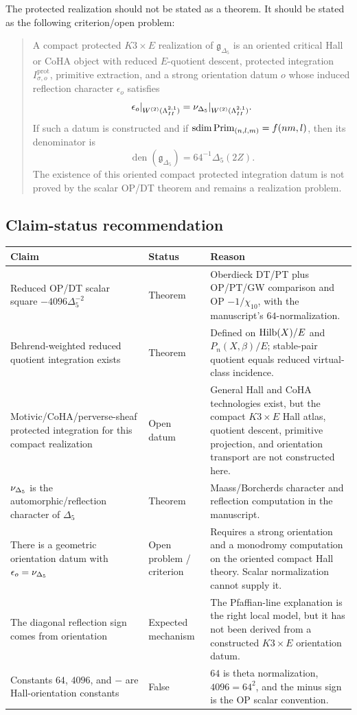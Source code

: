 The protected realization should not be stated as a theorem.  It should
be stated as the following criterion/open problem:

\begin{quote}
A compact protected \(K3\times E\) realization of
\(\mathfrak g_{\Delta_5}\) is an oriented critical Hall or CoHA object
with reduced \(E\)-quotient descent, protected integration
\(I^{\mathrm{prot}}_{\sigma,o}\), primitive extraction, and a strong
orientation datum \(o\) whose induced reflection character
\(\epsilon_o\) satisfies
\[
  \epsilon_o|_{W^{(2)}(\Lambda^{2,1}_{II})}
  =
  \nu_{\Delta_5}|_{W^{(2)}(\Lambda^{2,1}_{II})}.
\]
If such a datum is constructed and if
\(\operatorname{sdim}\operatorname{Prim}_{(n,l,m)}=f(nm,l)\), then its denominator is
\[
  \operatorname{den}(\mathfrak g_{\Delta_5})
  =
  64^{-1}\Delta_5(2Z).
\]
The existence of this oriented compact protected integration datum is
not proved by the scalar OP/DT theorem and remains a realization
problem.
\end{quote}

\subsection{Claim-status recommendation}

\begin{center}
\small
\begin{tabular}{p{}p{}p{}}
\hline
Claim & Status & Reason \\
\hline
Reduced OP/DT scalar square
\(-4096\Delta_5^{-2}\) &
Theorem &
Oberdieck DT/PT plus OP/PT/GW comparison and OP
\(-1/\chi_{10}\), with the manuscript's \(64\)-normalization. \\
Behrend-weighted reduced quotient integration exists &
Theorem &
Defined on \(\operatorname{Hilb}(X)/E\) and \(P_n(X,\beta)/E\); stable-pair quotient
equals reduced virtual-class incidence. \\
Motivic/CoHA/perverse-sheaf protected integration for this compact
realization &
Open datum &
General Hall and CoHA technologies exist, but the compact
\(K3\times E\) Hall atlas, quotient descent, primitive projection, and
orientation transport are not constructed here. \\
\(\nu_{\Delta_5}\) is the automorphic/reflection character of \(\Delta_5\) &
Theorem &
Maass/Borcherds character and reflection computation in the manuscript. \\
There is a geometric orientation datum with
\(\epsilon_o=\nu_{\Delta_5}\) &
Open problem /
criterion &
Requires a strong orientation and a monodromy computation on the
oriented compact Hall theory.  Scalar normalization cannot supply it. \\
The diagonal reflection sign comes from orientation &
Expected mechanism &
The Pfaffian-line explanation is the right local model, but it has not
been derived from a constructed \(K3\times E\) orientation datum. \\
Constants \(64\), \(4096\), and \(-\) are Hall-orientation constants &
False &
\(64\) is theta normalization, \(4096=64^2\), and the minus sign is the
OP scalar convention. \\
\hline
\end{tabular}
\end{center}

